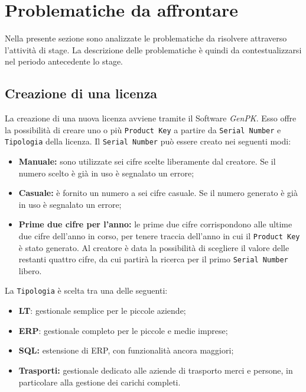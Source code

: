 \newpage
\section{Problematiche da affrontare}
Nella presente sezione sono analizzate le problematiche da risolvere attraverso l'attività di stage. La descrizione delle problematiche è quindi da contestualizzarsi nel periodo antecedente lo stage.

\subsection{Creazione di una licenza}

La creazione di una nuova licenza avviene tramite il Software \textit{GenPK}. Esso offre la possibilità di creare uno o più \texttt{Product Key} a partire da \texttt{Serial Number} e \texttt{Tipologia} della licenza.
Il \texttt{Serial Number} può essere creato nei seguenti modi:
\begin{itemize}
\item \textbf{Manuale:} sono utilizzate sei cifre scelte liberamente dal creatore. Se il numero scelto è già in uso è segnalato un errore;
\item \textbf{Casuale:} è fornito un numero a sei cifre casuale. Se il numero generato è già in uso è segnalato un errore; 
\item \textbf{Prime due cifre per l'anno:} le prime due cifre corrispondono alle ultime due cifre dell'anno in corso, per tenere traccia dell'anno in cui il \texttt{Product Key} è stato generato. Al creatore è data la possibilità di scegliere il valore delle restanti quattro cifre, da cui partirà la ricerca per il primo \texttt{Serial Number} libero.
\end{itemize}
La \texttt{Tipologia} è scelta tra una delle seguenti:
\begin{itemize}
\item \textbf{LT}: gestionale semplice per le piccole aziende;
\item \textbf{ERP}: gestionale completo per le piccole e medie imprese;
\item \textbf{SQL:} estensione di ERP, con funzionalità ancora maggiori;
\item \textbf{Trasporti:} gestionale dedicato alle aziende di trasporto merci e persone, in particolare alla gestione dei carichi completi.
\end{itemize}

